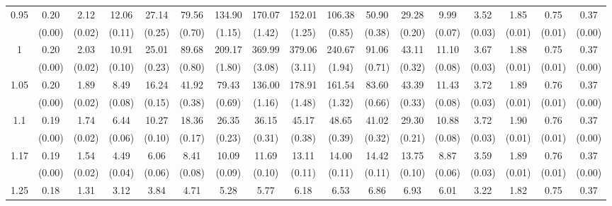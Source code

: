 \documentclass[12pt]{article}  %
\theoremstyle{plain}
\begin{document}
\begin{sidewaystable}[htbp]
\begin{tabular}{ccccccccccccccccc}
\multirow{2}{*}{0.95}  &0.20& 2.12 &12.06 &27.14& 79.56 &134.90& 170.07& 152.01 &106.38 &50.90 &29.28  &9.99  &3.52 & 1.85 & 0.75 & 0.37\\                
					  & (0.00)& (0.02)& (0.11)& (0.25)& (0.70)& (1.15)& (1.42)& (1.25)& (0.85)&  (0.38)&  (0.20)&  (0.07)&  (0.03)&  (0.01)&  (0.01)& (0.00)\\ \hline
\multirow{2}{*}{1}  & 0.20 &2.03 &10.91 &25.01 &89.68& 209.17& 369.99& 379.06 &240.67 &91.06 &43.11 &11.10 & 3.67 & 1.88 & 0.75 & 0.37\\
                      & (0.00)& (0.02)& (0.10)& (0.23)& (0.80)& (1.80)& (3.08)& (3.11)& (1.94)&  (0.71)&  (0.32)&  (0.08)&  (0.03)&  (0.01)&  (0.01)& (0.00)\\ \hline                                                                     
\multirow{2}{*}{1.05}  & 0.20 &1.89 & 8.49 &16.24& 41.92 & 79.43& 136.00& 178.91 &161.54 &83.60 &43.39& 11.43 & 3.72 & 1.89 & 0.76 & 0.37\\
                      & (0.00)&   (0.02)& (0.08)& (0.15)& (0.38)& (0.69)& (1.16)& (1.48)& (1.32)&  (0.66)&  (0.33)&  (0.08)&  (0.03)&  (0.01)&  (0.01)& (0.00)\\ \hline                                                                                                                                          
\multirow{2}{*}{1.1}  &0.19 &1.74 & 6.44 &10.27& 18.36 & 26.35 & 36.15 & 45.17 & 48.65 &41.02 &29.30 &10.88&  3.72&  1.90 & 0.76 & 0.37\\
                      &  (0.00)&   (0.02)& (0.06)& (0.10)& (0.17)& (0.23)& (0.31)& (0.38)& (0.39)&  (0.32)&  (0.21)&  (0.08)&  (0.03)&  (0.01)&  (0.01)& (0.00)\\ \hline
\multirow{2}{*}{1.17}  & 0.19 &1.54 & 4.49 & 6.06 & 8.41 & 10.09 & 11.69 & 13.11 & 14.00 &14.42 &13.75 & 8.87 & 3.59  &1.89 & 0.76&  0.37\\
                      & (0.00)&   (0.02)& (0.04)& (0.06)& (0.08)& (0.09)& (0.10)& (0.11)& (0.11)&  (0.11)&  (0.10)&  (0.06)&  (0.03)&  (0.01)&  (0.01)& (0.00)\\ \hline                                                                                                                                                                                                                                                                                    
                                                                     \multirow{2}{*}{1.25}  &0.18& 1.31 & 3.12 & 3.84 & 4.71 &  5.28  & 5.77  & 6.18  & 6.53 & 6.86 &6.93 & 6.01 & 3.22 & 1.82 & 0.75 & 0.37\\

\end{tabular}
\end{sidewaystable}
\end{document}
